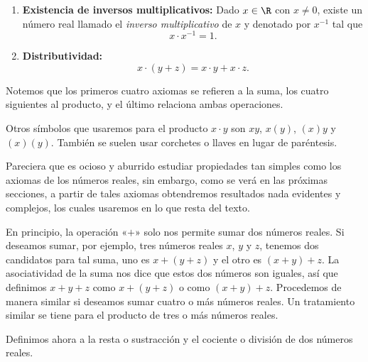 \documentclass[12pt,a4paper]{book}
\begin{document}
\begin{enumerate}[label=\arabic*.,series=axiomas]
        \item \textbf{Existencia de inversos multiplicativos:} Dado $x\in\R$ con $x\neq 0$, existe
        un número real llamado el \textit{inverso multiplicativo} de $x$ y denotado por $x^{-1}$
        tal que
        \begin{equation*}
            x\cdot x^{-1}=1.
        \end{equation*}
        \item \textbf{Distributividad:}
        \begin{equation*}
            x\cdot(y+z)=x\cdot y+x\cdot z.
        \end{equation*}
    \end{enumerate}

    Notemos que los primeros cuatro axiomas se refieren a la suma, los cuatro
    siguientes al producto, y el último relaciona ambas operaciones.

    Otros símbolos que usaremos para el producto $x\cdot y$ son $xy$, $x(y)$, $(x)y$ y
    $(x)(y)$. También se suelen usar corchetes o llaves en lugar de paréntesis.

    Pareciera que es ocioso y aburrido estudiar propiedades tan simples como
    los axiomas de los números reales, sin embargo, como se verá en las próximas
    secciones, a partir de tales axiomas obtendremos resultados nada evidentes
    y complejos, los cuales usaremos en lo que resta del texto.

    \begin{observacion}\label{obs:2}
        En principio, la operación «$+$» solo nos permite sumar dos
        números reales. Si deseamos sumar, por ejemplo, tres números reales $x$, $y$
        y $z$, tenemos dos candidatos para tal suma, uno es $x+(y+z)$ y el otro es
        $(x+y)+z$. La asociatividad de la suma nos dice que estos dos números son
        iguales, así que definimos $x+y+z$ como $x+(y+z)$ o como $(x+y)+z$.
        Procedemos de manera similar si deseamos sumar cuatro o más números
        reales. Un tratamiento similar se tiene para el producto de tres o más números
        reales.
    \end{observacion}

    Definimos ahora a la resta o sustracción y el cociente o división de dos
    números reales.
\end{document}
